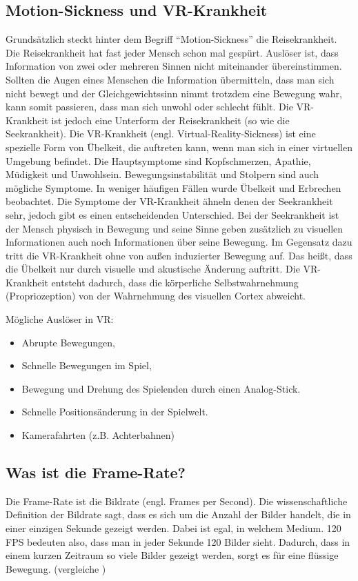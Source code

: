 \subsection{Motion-Sickness und VR-Krankheit} \label{simon_motionsickness}
Grundsätzlich steckt hinter dem Begriff "`Motion-Sickness"' die Reisekrankheit. Die Reisekrankheit hat fast jeder Mensch schon mal gespürt. Auslöser ist, dass Information von zwei oder mehreren Sinnen nicht miteinander übereinstimmen. Sollten die Augen eines Menschen die Information übermitteln, dass man sich nicht bewegt und der Gleichgewichtssinn nimmt trotzdem eine Bewegung wahr, kann somit passieren, dass man sich unwohl oder schlecht fühlt. Die VR-Krankheit ist jedoch eine Unterform der Reisekrankheit (so wie die Seekrankheit).
Die VR-Krankheit (engl. Virtual-Reality-Sickness) ist eine spezielle Form von Übelkeit, die auftreten kann, wenn man sich in einer virtuellen Umgebung befindet. Die Hauptsymptome sind Kopfschmerzen, Apathie, Müdigkeit und Unwohlsein. Bewegungsinstabilität und Stolpern sind auch mögliche Symptome. In weniger häufigen Fällen wurde Übelkeit und Erbrechen beobachtet. Die Symptome der VR-Krankheit ähneln denen der Seekrankheit sehr, jedoch gibt es einen entscheidenden Unterschied. Bei der Seekrankheit ist der Mensch physisch in Bewegung und seine Sinne geben zusätzlich zu visuellen Informationen auch noch Informationen über seine Bewegung. Im Gegensatz dazu tritt die VR-Krankheit ohne von außen induzierter Bewegung auf. Das heißt, dass die Übelkeit nur durch visuelle und akustische Änderung auftritt. Die VR-Krankheit entsteht dadurch, dass die körperliche Selbstwahrnehmung (Propriozeption) von der Wahrnehmung des visuellen Cortex abweicht.
\cite{_motionsickness}
\cite{_vr_quovadis}

\vspace{1cm}
Mögliche Auslöser in VR:
\begin{itemize}
	\item Abrupte Bewegungen,
	\item Schnelle Bewegungen im Spiel,
	\item Bewegung und Drehung des Spielenden durch einen Analog-Stick.
	\item Schnelle Positionsänderung in der Spielwelt.
	\item Kamerafahrten (z.B. Achterbahnen)
\end{itemize}


\subsection{Was ist die Frame-Rate?}
Die Frame-Rate ist die Bildrate (engl. Frames per Second). Die wissenschaftliche Definition der Bildrate sagt, dass es sich um die Anzahl der Bilder handelt, die in einer einzigen Sekunde gezeigt werden. Dabei ist egal, in welchem Medium. 120 FPS bedeuten also, dass man in jeder Sekunde 120 Bilder sieht. Dadurch, dass in einem kurzen Zeitraum so viele Bilder gezeigt werden, sorgt es für eine flüssige Bewegung.
(vergleiche \cite{_vr_linde})

